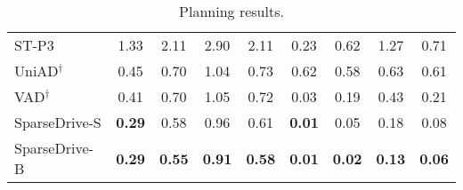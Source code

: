\begin{table}[t]
\begin{subtable}[h]{0.6\textwidth}
{\begin{tabular}{l|cccc|cccc}
\midrule
ST-P3~\cite{stp3} & 1.33 & 2.11 & 2.90 & \cellcolor{gray!30}2.11 & 0.23 & 0.62 & 1.27 & \cellcolor{gray!30}0.71 \\
UniAD$^\dagger$~\cite{uniad} & 0.45 & 0.70 & 1.04 & \cellcolor{gray!30}0.73 & 0.62 & 0.58 & 0.63  & \cellcolor{gray!30}0.61 \\
VAD$^\dagger$~\cite{vad} & 0.41 & 0.70 & 1.05 & \cellcolor{gray!30}0.72 & 0.03 & 0.19 & 0.43  & \cellcolor{gray!30}0.21 \\ 
SparseDrive-S & \textbf{0.29} & 0.58 & 0.96 & \cellcolor{gray!30}0.61 & \textbf{0.01} & 0.05 & 0.18 & \cellcolor{gray!30}0.08 \\
SparseDrive-B &\textbf{0.29} & \textbf{0.55} & \textbf{0.91} & \cellcolor{gray!30}\textbf{0.58} & \textbf{0.01} & \textbf{0.02} & \textbf{0.13} & \cellcolor{gray!30}\textbf{0.06} \\
\bottomrule
\end{tabular}
}
\caption{Planning results.}
\label{tab:planning}
\end{subtable}
\end{table}